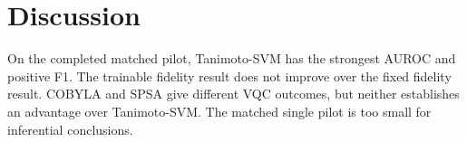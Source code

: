 \section{Discussion}
On the completed matched pilot, Tanimoto-SVM has the strongest AUROC and positive
F1. The trainable fidelity result does not improve over the fixed fidelity result.
COBYLA and SPSA give different VQC outcomes, but neither establishes an advantage
over Tanimoto-SVM. The matched single pilot is too small for inferential conclusions.
